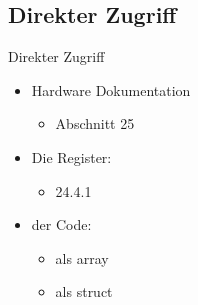 \subsection{Direkter Zugriff}
\begin{frame}{Direkter Zugriff}
 \begin{itemize}
  \item Hardware Dokumentation 
  \begin{itemize}
   \item {} Abschnitt 25
  \end{itemize}
  \item Die Register:
  \begin{itemize}
    \item {} 24.4.1
  \end{itemize}
  \item der Code:
  \begin{itemize}
   \item {} als array
   \item {} als struct
  \end{itemize}
 \end{itemize}
\end{frame}

